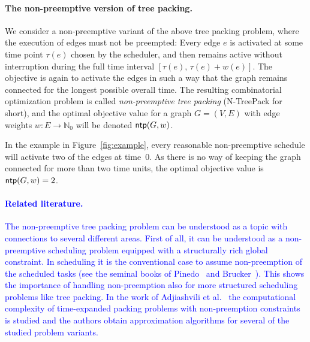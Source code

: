\documentclass[runningheads]{llncs}
\newcommand{\NN}{\mathbb{N}}
\newcommand{\xxxNTP}{{\sc N-TreePack}}
\DeclareMathOperator{\ntp}{\text{\sf ntp}}
\newcommand{\lasse}[1]{\textcolor{blue}{#1}}
\begin{document}
\paragraph{The non-preemptive version of tree packing.}
We consider a non-preemptive variant of the above tree packing problem,
where the execution of edges must not be preempted: 
Every edge $e$ is activated at some time point $\tau(e)$ chosen by the scheduler, and then 
remains active without interruption during the full time interval $[\tau(e),\,\tau(e)+w(e)]$.
The objective is again to activate the edges in such a way that the graph
remains connected for the longest possible overall time.
The resulting combinatorial optimization problem is called \emph{non-preemptive tree packing}
({\xxxNTP} for short), and the optimal objective value for a graph $G=(V,E)$ with edge 
weights $w:E\to\NN_0$ will be denoted $\ntp(G,w)$.

In the example in Figure~\ref{fig:example}, every reasonable non-preemptive
schedule will activate two of the edges at time~$0$.
As there is no way of keeping the graph connected for more than two time units, 
the optimal objective value is $\ntp(G,w)=2$.

\lasse{\paragraph{Related literature.}
The non-preemptive tree packing problem can be understood as a topic with connections to several different 
areas. First of all, it can be understood as a non-preemptive scheduling problem equipped with a structurally rich global constraint.
In scheduling it is the conventional case to assume non-preemption of the scheduled tasks (see the seminal books of Pinedo~\cite{pinedo2012scheduling} and Brucker~\cite{brucker1999scheduling}).
This shows the importance of handling non-preemption also for more structured scheduling problems like tree packing.
In the work of Adjiashvili et al.~\cite{adjiashvili2014time} the computational complexity of time-expanded packing problems with non-preemption constraints 
is studied and the authors obtain approximation algorithms for several of the studied problem variants.
}
\end{document}
